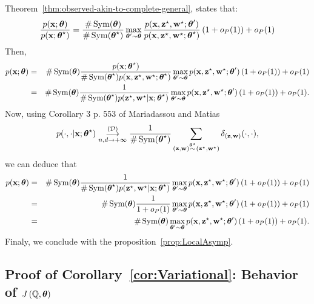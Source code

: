 Theorem~\ref{thm:observed-akin-to-complete-general}, states that:
\begin{equation*}
    \frac{\prob(\bx; \btheta)}{\prob(\bx; \bthetas)} = \frac{\# \Symmetric(\btheta)}{\# \Symmetric(\bthetas)} \max_{\btheta' \sim \btheta} \frac{\prob(\bx, \bzs, \bws; \btheta')}{\prob(\bx, \bzs, \bws; \bthetas)}\left(1 + \smallO_P(1)\right) + \smallO_P(1)
\end{equation*}
Then,
\begin{eqnarray*}
\prob(\bx; \btheta)&=&\# \Symmetric(\btheta)\frac{\prob(\bx; \bthetas)}{\# \Symmetric(\bthetas)\prob(\bx, \bzs, \bws; \bthetas)} \max_{\btheta' \sim \btheta} \prob(\bx, \bzs, \bws; \btheta')\left(1 + \smallO_P(1)\right) + \smallO_P(1)\\
&=&\# \Symmetric(\btheta)\frac{1}{\# \Symmetric(\bthetas)\prob( \bzs, \bws|\bx; \bthetas)} \max_{\btheta' \sim \btheta} \prob(\bx, \bzs, \bws; \btheta')\left(1 + \smallO_P(1)\right) + \smallO_P(1).\\
\end{eqnarray*}
Now, using Corollary 3 p. 553 of Mariadassou and Matias~\cite{mariadassou2015}  
\[p(\cdot,\cdot|\mathbf{x};\boldsymbol{\theta}^\star)\overset{({\cal D})}{\underset{n,d\to+\infty}{\longrightarrow}}\frac{1}{\#\operatorname{Sym}(\boldsymbol{\theta}^\star)}\sum_{(\mathbf{z},\mathbf{w})\overset{\boldsymbol{\theta}^\star}{\sim}(\mathbf{z}^\star,\mathbf{w}^\star)}{\delta_{(\mathbf{z},\mathbf{w})}(\cdot,\cdot)},\]
 we can deduce that
\begin{eqnarray}
\nonumber
\prob(\bx; \btheta)
&=&\# \Symmetric(\btheta)\frac{1}{\# \Symmetric(\bthetas)\prob( \bzs, \bws|\bx; \bthetas)} \max_{\btheta' \sim \btheta} \prob(\bx, \bzs, \bws; \btheta')\left(1 + \smallO_P(1)\right) + \smallO_P(1)\\
\nonumber
&=&\# \Symmetric(\btheta)\frac{1}{1 + \smallO_P(1)} \max_{\btheta' \sim \btheta} \prob(\bx, \bzs, \bws; \btheta')\left(1 + \smallO_P(1)\right) + \smallO_P(1)\\
\label{Eq:appendix:emv}
&=&\# \Symmetric(\btheta) \max_{\btheta' \sim \btheta}\prob(\bx, \bzs, \bws; \btheta')\left(1 + \smallO_P(1)\right) + \smallO_P(1).
\end{eqnarray}
Finaly, we conclude with the proposition~\ref{prop:LocalAsymp}.



\subsection{Proof of Corollary~\ref{cor:Variational}: Behavior of $J\left(\mathbb{Q},\boldsymbol{\theta}\right)$}\label{annexe:cor:Variational}

